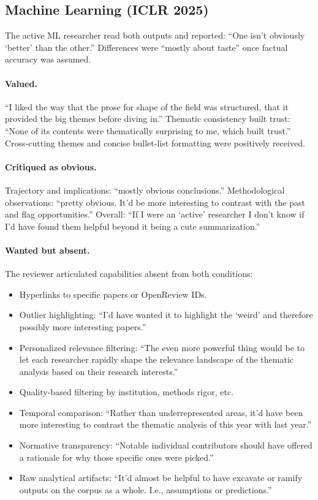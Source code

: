 \documentclass{article}
\begin{document}
\subsection{Machine Learning (ICLR 2025)}

The active ML researcher read both outputs and reported: ``One isn't obviously `better' than the other.'' Differences were ``mostly about taste'' once factual accuracy was assumed.

\paragraph{Valued.} ``I liked the way that the prose for shape of the field was structured, that it provided the big themes before diving in.'' Thematic consistency built trust: ``None of its contents were thematically surprising to me, which built trust.'' Cross-cutting themes and concise bullet-list formatting were positively received.

\paragraph{Critiqued as obvious.} Trajectory and implications: ``mostly obvious conclusions.'' Methodological observations: ``pretty obvious. It'd be more interesting to contrast with the past and flag opportunities.'' Overall: ``If I were an `active' researcher I don't know if I'd have found them helpful beyond it being a cute summarization.''

\paragraph{Wanted but absent.} The reviewer articulated capabilities absent from both conditions:
\begin{itemize}
    \item Hyperlinks to specific papers or OpenReview IDs.
    \item Outlier highlighting: ``I'd have wanted it to highlight the `weird' and therefore possibly more interesting papers.''
    \item Personalized relevance filtering: ``The even more powerful thing would be to let each researcher rapidly shape the relevance landscape of the thematic analysis based on their research interests.''
    \item Quality-based filtering by institution, methods rigor, etc.
    \item Temporal comparison: ``Rather than underrepresented areas, it'd have been more interesting to contrast the thematic analysis of this year with last year.''
    \item Normative transparency: ``Notable individual contributors should have offered a rationale for why those specific ones were picked.''
    \item Raw analytical artifacts: ``It'd almost be helpful to have excavate or ramify outputs on the corpus as a whole. I.e., assumptions or predictions.''
\end{itemize}
\end{document}
